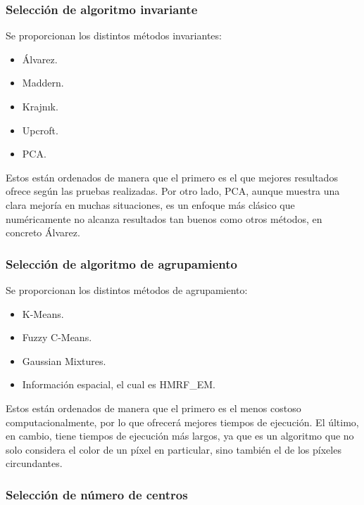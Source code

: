 \subsubsection{Selección de algoritmo invariante}\label{selección-de-algoritmo-invariante}

Se proporcionan los distintos métodos invariantes:

\begin{itemize}
    \item Álvarez.
    \item Maddern.
    \item Krajnık.
    \item Upcroft.
    \item PCA.
\end{itemize}

Estos están ordenados de manera que el primero es el que mejores resultados ofrece según las pruebas realizadas. Por otro lado, PCA, aunque muestra una clara mejoría en muchas situaciones, es un enfoque más clásico que numéricamente no alcanza resultados tan buenos como otros métodos, en concreto Álvarez.

\subsubsection{Selección de algoritmo de agrupamiento}\label{selección-de-algoritmo-de-agrupamiento}

Se proporcionan los distintos métodos de agrupamiento:

\begin{itemize}
    \item K-Means.
    \item Fuzzy C-Means.
    \item Gaussian Mixtures.
    \item Información espacial, el cual es HMRF\_EM.
\end{itemize}

Estos están ordenados de manera que el primero es el menos costoso computacionalmente, por lo que ofrecerá mejores tiempos de ejecución. El último, en cambio, tiene tiempos de ejecución más largos, ya que es un algoritmo que no solo considera el color de un píxel en particular, sino también el de los píxeles circundantes.

\subsubsection{Selección de número de centros}\label{selección-de-número-de-centros}

